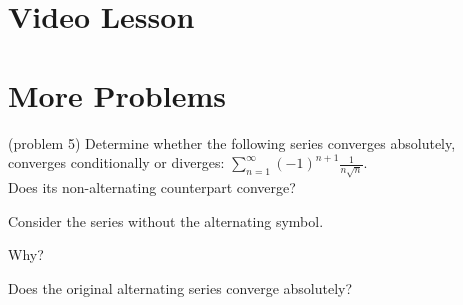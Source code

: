 \documentclass[handout]{ximera}
\begin{document}
\section{Video Lesson}




\begin{center}
\begin{foldable}
\end{foldable}
\end{center}


\section{More Problems}



\begin{problem}(problem 5)
Determine whether the following series converges absolutely, converges conditionally or diverges: $\displaystyle{\sum_{n=1}^\infty (-1)^{n+1} \frac{1}{n\sqrt n}}$.\\
Does its non-alternating counterpart converge?
\begin{hint} 
Consider the series without the alternating symbol.
\end{hint}
\begin{multipleChoice}
\end{multipleChoice}

Why?
\begin{multipleChoice}
\end{multipleChoice}


Does the original alternating series converge absolutely?
\begin{multipleChoice}
\end{multipleChoice}

\end{problem}
\end{document}

